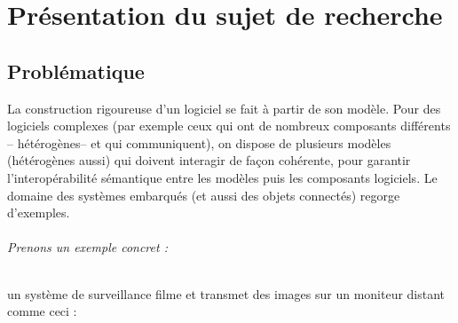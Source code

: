 \documentclass[12pt,a4paper]{report}
\begin{document}
\chapter{Présentation du sujet de recherche}
\section{Problématique}

La construction rigoureuse d'un logiciel se fait à partir de son modèle. Pour des 
logiciels complexes (par exemple ceux qui ont de nombreux composants différents -- 
hétérogènes-- et qui communiquent), on dispose de plusieurs modèles (hétérogènes 
aussi) qui doivent interagir de façon cohérente, pour garantir l'interopérabilité 
sémantique entre les modèles puis les composants logiciels. Le domaine des systèmes 
embarqués (et aussi des objets connectés) regorge d'exemples.\\

\subparagraph*{Prenons un exemple concret :\\ }
un système de surveillance filme et transmet des images sur un moniteur distant comme ceci : 
\end{document}
